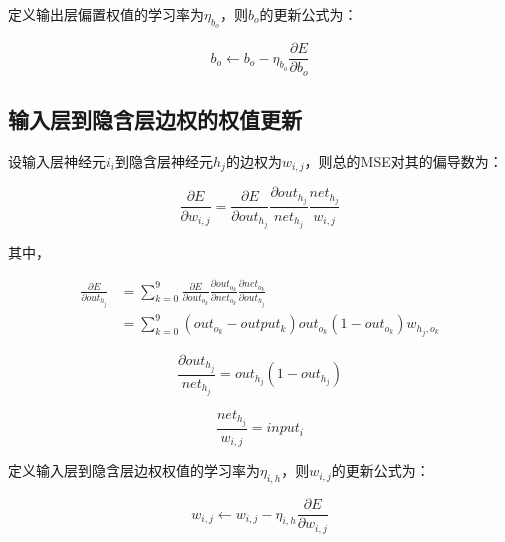\documentclass[forprint]{WHUBachelor}
\begin{document}
      定义输出层偏置权值的学习率为$\eta_{b_o}$，则$b_o$的更新公式为：

      \begin{equation}
        b_o\gets b_o-\eta_{b_o}\frac{\partial{E}}{\partial{b_o}}
      \end{equation}

    \subsection{输入层到隐含层边权的权值更新}

      设输入层神经元$i_i$到隐含层神经元$h_j$的边权为$w_{i,j}$，则总的MSE对其的偏导数为：

      \begin{equation}
        \frac{\partial E}{\partial w_{i,j}}=
        \frac{\partial E}{\partial out_{h_j}}
        \frac{\partial out_{h_j}}{net_{h_j}}
        \frac{net_{h_j}}{w_{i,j}}
        \label{equa31}
      \end{equation}

      其中，
      
      \begin{equation}
        \begin{split}
        \frac{\partial E}{\partial out_{h_j}}&=
        \sum_{k=0}^9 \frac{\partial E}{\partial out_{o_k}}
        \frac{\partial out_{o_k}}{\partial net_{o_k}}
        \frac{\partial net_{o_k}}{\partial out_{h_j}} 
        \\
        &=
        \sum_{k=0}^9
        (out_{o_k}-output_k)
        out_{o_k}(1-out_{o_k})
        w_{h_j,o_k}
        \end{split}
        \label{equa32}
      \end{equation}

      \begin{equation}
        \frac{\partial out_{h_j}}{net_{h_j}}=
        out_{h_j}(1-out_{h_j})
        \label{equa33}
      \end{equation}

      \begin{equation}
        \frac{net_{h_j}}{w_{i,j}}=
        input_i
        \label{equa34}
      \end{equation}

      定义输入层到隐含层边权权值的学习率为$\eta_{i,h}$，则$w_{i,j}$的更新公式为：

      \begin{equation}
        w_{i,j} \gets w_{i,j} - \eta_{i,h} \frac{\partial E} {\partial w_{i,j}}
      \end{equation}
\end{document}

